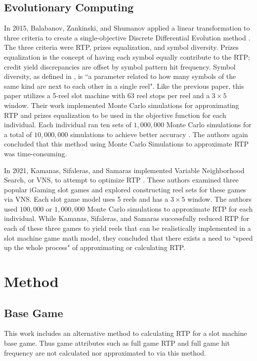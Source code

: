 \documentclass[conference]{IEEEtran}
\begin{document}
\subsection{Evolutionary Computing}
In 2015, Balabanov, Zankinski, and Shumanov applied a linear transformation to three criteria to create a single-objective Discrete Differential Evolution method \cite{balabanovDDE}.
The three criteria were RTP, prizes equalization, and symbol diversity.
Prizes equalization is the concept of having each symbol equally contribute to the RTP; credit yield discrepancies are offset by symbol pattern hit frequency.
Symbol diversity, as defined in \cite{balabanovDDE}, is ``a parameter related to how many symbols of the same kind are next to each other in a single reel".
Like the previous paper, this paper utilizes a 5-reel slot machine with 63 reel stops per reel and a $3\times 5$ window.
Their work implemented Monte Carlo simulations for approximating RTP and prizes equalization to be used in the objective function for each individual.
Each individual ran ten sets of $1,000,000$ Monte Carlo simulations for a total of $10,000,000$ simulations to achieve better accuracy \cite{balabanovDDE}.
The authors again concluded that this method using Monte Carlo Simulations to approximate RTP was time-consuming.
\par
In 2021, Kamanas, Sifaleras, and Samaras implemented Variable Neighborhood Search, or VNS, to attempt to optimize RTP \cite{kamanas2021slot}.
These authors examined three popular iGaming slot games and explored constructing reel sets for these games via VNS.
Each slot game model uses 5 reels and has a $3\times 5$ window.
The authors used $100,000$ or $1,000,000$ Monte Carlo simulations to approximate RTP for each individual.
While Kamanas, Sifaleras, and Samaras successfully reduced RTP for each of these three games to yield reels that can be realistically implemented in a slot machine game math model, they concluded that there exists a need to ``speed up the whole process" of approximating or calculating RTP\cite{kamanas2021slot}.

\section{Method}
\label{method}
\subsection{Base Game}
This work includes an alternative method to calculating RTP for a slot machine base game. Thus game attributes such as full game RTP and full game hit frequency are not calculated nor approximated to via this method.
\end{document}
